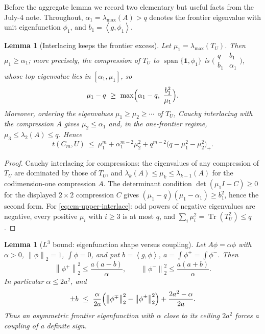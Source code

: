 \documentclass[11pt]{article}
\newtheorem{lemma}[theorem]{Lemma}
\newcommand{\one}{\mathbf 1}
\newcommand{\ip}[2]{\left\langle #1,#2\right\rangle}
\newcommand{\Tr}{\operatorname{Tr}}
\newcommand{\norm}[1]{\left\|#1\right\|}
\begin{document}
Before the aggregate lemma we record two elementary but useful facts from the
July-4 note.  Throughout, $\alpha_1=\lambda_{\max}(A)>q$ denotes the frontier
eigenvalue with unit eigenfunction $\phi_1$, and $b_1=\ip{g}{\phi_1}$.

\begin{lemma}[Interlacing keeps the frontier excess]\label{lem:interlace}
Let $\mu_1=\lambda_{\max}(T_U)$.  Then $\mu_1\ge\alpha_1$; more precisely, the
compression of $T_U$ to $\operatorname{span}\{\one,\phi_1\}$ is
$\bigl(\begin{smallmatrix}q&b_1\\ b_1&\alpha_1\end{smallmatrix}\bigr)$, whose
top eigenvalue lies in $[\alpha_1,\mu_1]$, so
\[
        \mu_1-q\ \ge\ \max\Bigl(\alpha_1-q,\ \frac{b_1^2}{\mu_1}\Bigr).
\]
Moreover, ordering the eigenvalues $\mu_1\ge\mu_2\ge\cdots$ of $T_U$, Cauchy
interlacing with the compression $A$ gives $\mu_2\le\alpha_1$ and, in the
one-frontier regime, $\mu_3\le\lambda_2(A)\le q$.  Hence
\begin{equation}\label{eq:cm-upper-interlace}
        t(C_m,U)\ \le\ \mu_1^m+\alpha_1^{m-2}\mu_2^2
        +q^{m-2}\bigl(q-\mu_1^2-\mu_2^2\bigr)_+ .
\end{equation}
\end{lemma}

\begin{proof}
Cauchy interlacing for compressions: the eigenvalues of any compression of
$T_U$ are dominated by those of $T_U$, and $\lambda_k(A)\le\mu_k\le
\lambda_{k-1}(A)$ for the codimension-one compression $A$.  The determinant
condition $\det(\mu_1I-C)\ge0$ for the displayed $2\times2$ compression $C$
gives $(\mu_1-q)(\mu_1-\alpha_1)\ge b_1^2$, hence the second form.  For
\eqref{eq:cm-upper-interlace}: odd powers of negative eigenvalues are
negative, every positive $\mu_i$ with $i\ge3$ is at most $q$, and
$\sum_i\mu_i^2=\Tr(T_U^2)\le q$.
\end{proof}

\begin{lemma}[$L^3$ bound: eigenfunction shape versus coupling]\label{lem:L3}
Let $A\phi=\alpha\phi$ with $\alpha>0$, $\norm\phi_2=1$, $\int\phi=0$, and put
$b=\ip{g}{\phi}$, $a=\int\phi^+=\int\phi^-$.  Then
\[
        \norm{\phi^+}_2^2\le\frac{a(a-b)}{\alpha},
        \qquad
        \norm{\phi^-}_2^2\le\frac{a(a+b)}{\alpha}.
\]
In particular $\alpha\le2a^2$, and
\[
        \pm b\ \le\ \frac{\alpha}{2a}\Bigl(\norm{\phi^\mp}_2^2-\norm{\phi^\pm}_2^2\Bigr)
        +\frac{2a^2-\alpha}{2a}.
\]
Thus an asymmetric frontier eigenfunction with $\alpha$ close to its ceiling
$2a^2$ forces a coupling of a definite sign.
\end{lemma}
\end{document}
